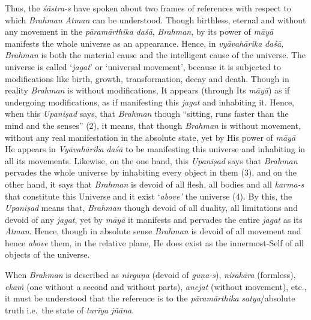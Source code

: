 Thus, the \emph{śāstra-s} have spoken about two frames of references with respect to which \emph{Brahman}  \emph{Ātman} can be understood. Though birthless, eternal and without any movement in the \emph{pāramārthika} \emph{daśā}, \emph{Brahman}, by its power of \emph{māyā} manifests the whole universe as an appearance. Hence, in \emph{vyāvahārika} \emph{daśā}, \emph{Brahman} is both the material cause and the intelligent cause of the universe. The universe is called `\emph{jagat}' or `universal movement', because it is subjected to modifications like birth, growth, transformation, decay and death. Though in reality \emph{Brahman} is without modifications, It appears (through Its \emph{māyā}) as if undergoing modifications, as if manifesting this \emph{jagat} and inhabiting it. Hence, when this \emph{Upaniṣad} says, that \emph{Brahman} though ``sitting, runs faster than the mind and the senses'' (2), it means, that though \emph{Brahman} is without movement, without any real manifestation in the absolute state, yet by His power of \emph{māyā} He appears in \emph{Vyāvahārika} \emph{daśā} to be manifesting this universe and inhabiting in all its movements. Likewise, on the one hand, this \emph{Upaniṣad} says that \emph{Brahman} pervades the whole universe by inhabiting every object in them (3), and on the other hand, it says that \emph{Brahman} is devoid of all flesh, all bodies and all \emph{karma-s} that constitute this Universe and it exist `\emph{above'} the universe (4). By this, the \emph{Upaniṣad} means that, \emph{Brahman} though devoid of all duality, all limitations and devoid of any \emph{jagat}, yet by \emph{māyā} it manifests and pervades the entire \emph{jagat} as its \emph{Ātman}. Hence, though in absolute sense \emph{Brahman} is devoid of all movement and hence \emph{above} them, in the relative plane, He does exist as the innermost-Self of all objects of the universe.

When \emph{Brahman} is described as \emph{nirguṇa} (devoid of \emph{guṇa-s}), \emph{nirākāra} (formless), \emph{ekaṁ} (one without a second and without parts), \emph{anejat} (without movement), etc., it must be understood that the reference is to the \emph{pāramārthika} \emph{satya}/absolute truth i.e.\ the state of \emph{turīya}  \emph{jñāna}.

